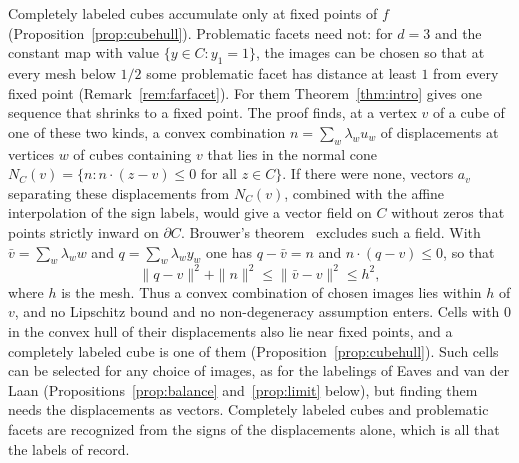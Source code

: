 \documentclass[11pt]{amsart}
\theoremstyle{definition}
\theoremstyle{remark}
\numberwithin{equation}{section}
\begin{document}
Completely labeled cubes accumulate only at fixed points of $f$ (Proposition~\ref{prop:cubehull}). Problematic facets need not: for $d=3$ and the constant map with value $\{y\in C:y_1=1\}$, the images can be chosen so that at every mesh below $1/2$ some problematic facet has distance at least $1$ from every fixed point (Remark~\ref{rem:farfacet}). For them Theorem~\ref{thm:intro} gives one sequence that shrinks to a fixed point. The proof finds, at a vertex $v$ of a cube of one of these two kinds, a convex combination $n=\sum_w\lambda_wu_w$ of displacements at vertices $w$ of cubes containing $v$ that lies in the normal cone $N_C(v)=\{n:n\cdot(z-v)\le0\text{ for all }z\in C\}$. If there were none, vectors $a_v$ separating these displacements from $N_C(v)$, combined with the affine interpolation of the sign labels, would give a vector field on $C$ without zeros that points strictly inward on $\partial C$. Brouwer's theorem~\cite{Brou11} excludes such a field. With $\bar v=\sum_w\lambda_ww$ and $q=\sum_w\lambda_wy_w$ one has $q-\bar v=n$ and $n\cdot(q-v)\le0$, so that
\begin{equation}\label{intro:est}
\|q-v\|^2+\|n\|^2\le\|\bar v-v\|^2\le h^2,
\end{equation}
where $h$ is the mesh. Thus a convex combination of chosen images lies within $h$ of $v$, and no Lipschitz bound and no non-degeneracy assumption enters. Cells with $0$ in the convex hull of their displacements also lie near fixed points, and a completely labeled cube is one of them (Proposition~\ref{prop:cubehull}). Such cells can be selected for any choice of images, as for the labelings of Eaves \cite{Eaves} and van der Laan \cite[\S4.8]{Laa80} (Propositions~\ref{prop:balance} and~\ref{prop:limit} below), but finding them needs the displacements as vectors. Completely labeled cubes and problematic facets are recognized from the signs of the displacements alone, which is all that the labels of \cite{GS1} record.
\end{document}
